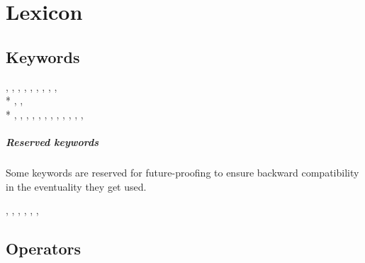 \chapter{Lexicon}

\section{Keywords}

, , , , , ,
, , , \\*
, , \\*
, , ,
, , , , ,
, , , , 

\paragraph{Reserved keywords} Some keywords are reserved for future-proofing
to ensure backward compatibility in the eventuality they get used.

, , , , , ,

\section{Operators}

